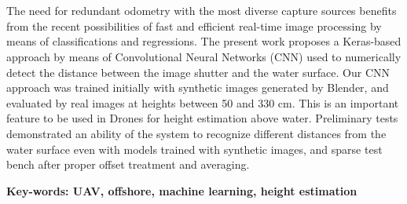 \section*{} 
The need for redundant odometry with the most diverse capture sources benefits from the recent possibilities of fast and efficient real-time image processing by means of classifications and regressions. The present work proposes a Keras-based approach by means of Convolutional Neural Networks (CNN) used to numerically detect the distance between the image shutter and the water surface. Our CNN approach was trained initially with synthetic images generated by Blender, and evaluated by real images at heights between 50 and 330 cm. This is an important feature to be used in Drones for height estimation above water. Preliminary tests demonstrated an ability of the system to recognize different distances from the water surface even with models trained with synthetic images, and sparse test bench after proper offset treatment and averaging.

{\bf Key-words: UAV, offshore, machine learning, height estimation} 